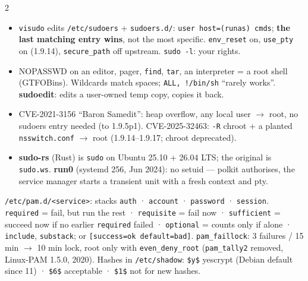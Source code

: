 \documentclass[8pt]{extarticle}
\newcommand\ct[1]{\texttt{#1}}
\newcommand\hd[1]{\par\vspace{2pt}\noindent{\small\bfseries\color{sheetBlue}#1}\par\vspace{1pt}}
\begin{document}
\begin{multicols}{2}
\hd{sudo, sudo-rs, run0}
\begin{itemize}
  \item \ct{visudo} edits \ct{/etc/sudoers} + \ct{sudoers.d/}: \ct{user host=(runas) cmds};
        \textbf{the last matching entry wins}, not the most specific. \ct{env\_reset} on,
        \ct{use\_pty} on (1.9.14), \ct{secure\_path} off upstream. \ct{sudo -l}: your rights.
  \item NOPASSWD on an editor, pager, \ct{find}, \ct{tar}, an interpreter = a root shell
        (GTFOBins). Wildcards match spaces; \ct{ALL, !/bin/sh} ``rarely works''.
        \textbf{sudoedit}: edits a user-owned temp copy, copies it back.
  \item CVE-2021-3156 ``Baron Samedit'': heap overflow, any local user $\to$ root, no sudoers
        entry needed (to 1.9.5p1). CVE-2025-32463: \ct{-R} chroot + a planted
        \ct{nsswitch.conf} $\to$ root (1.9.14–1.9.17; chroot deprecated).
  \item \textbf{sudo-rs} (Rust) is \ct{sudo} on Ubuntu 25.10 + 26.04 LTS; the original is
        \ct{sudo.ws}. \textbf{run0} (systemd 256, Jun 2024): no setuid — polkit authorises, the
        service manager starts a transient unit with a fresh context and pty.
\end{itemize}

\hd{PAM}
\ct{/etc/pam.d/<service>}: stacks \ct{auth} · \ct{account} · \ct{password} · \ct{session}.
\ct{required} = fail, but run the rest · \ct{requisite} = fail now · \ct{sufficient} = succeed now
if no earlier \ct{required} failed · \ct{optional} = counts only if alone · \ct{include},
\ct{substack}; or \ct{[success=ok default=bad]}. \ct{pam\_faillock}: 3 failures / 15 min $\to$
10 min lock, root only with \ct{even\_deny\_root} (\ct{pam\_tally2} removed, Linux-PAM 1.5.0, 2020).
Hashes in \ct{/etc/shadow}: \ct{\$y\$} yescrypt (Debian default since 11) · \ct{\$6\$} acceptable ·
\ct{\$1\$} not for new hashes.


\end{multicols}
\end{document}

